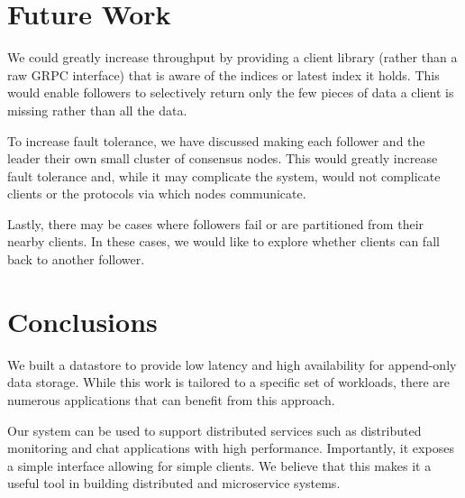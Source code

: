 \documentclass[11pt,english,twocolumn]{article}
\begin{document}
\vspace{-0.4cm}
\section{Future Work}
We could greatly increase throughput by providing a client library (rather than
a raw GRPC interface) that is aware of the indices or latest index it holds.
This would enable followers to selectively return only the few pieces of data a
client is missing rather than all the data.

To increase fault tolerance, we have discussed making each follower and the
leader their own small cluster of consensus nodes. This would greatly increase
fault tolerance and, while it may complicate the system, would not complicate
clients or the protocols via which nodes communicate.

Lastly, there may be cases where followers fail or are partitioned from their
nearby clients. In these cases, we would like to explore whether clients can
fall back to another follower.
\vspace{-0.3cm}
\section{Conclusions}
We built a datastore to provide low latency and high availability for append-only
data storage. While this work is tailored to a specific set of workloads, there
are numerous applications that can benefit from this approach.

Our system can be used to support distributed services such as distributed
monitoring and chat applications with high performance. Importantly, it exposes
a simple interface allowing for simple clients. We believe that this makes it a
useful tool in building distributed and microservice systems.
\vspace{-0.4cm}
 

\end{document}
